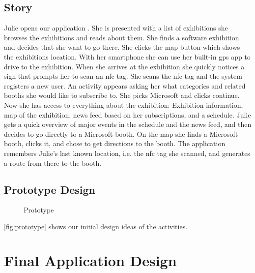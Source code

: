 \subsection*{Story}
Julie opens our application . She is presented with a list of exhibitions she browses the exhibitions and reads about them. She finds a software exhibition and decides that she want to go there. She clicks the map button which shows the exhibitions location. With her smartphone she can use her built-in \ac{gps} app to drive to the exhibition. When she arrives at the exhibition she quickly notices a sign that prompts her to scan an \acs{nfc} tag. She scans the \acs{nfc} tag and the system registers a new user. An activity appears asking her what categories and related booths she would like to subscribe to. She picks Microsoft and clicks continue. Now she has access to everything about the exhibition: Exhibition information, map of the exhibition, news feed based on her subscriptions, and a schedule. Julie gets a quick overview of major events in the schedule and the news feed, and then decides to go directly to a Microsoft booth. On the map she finds a Microsoft booth, clicks it, and chose to get directions to the booth. The application remembers Julie's last known location, i.e. the \acs{nfc} tag she scanned, and generates a route from there to the booth.

\subsection*{Prototype Design}

\begin{figure}[H]
\centering
\caption{Prototype}
\label{fig:prototype}
\end{figure}

\autoref{fig:prototype} shows our initial design ideas of the activities. 

\pagebreak
\section{Final Application Design}

